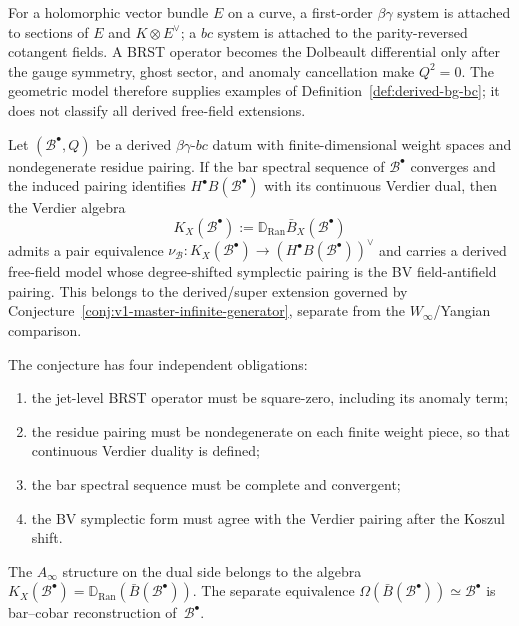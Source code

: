 \begin{remark}
For a holomorphic vector bundle $E$ on a curve, a first-order
$\beta\gamma$ system is attached to sections of $E$ and
$K\otimes E^\vee$; a $bc$ system is attached to the parity-reversed
cotangent fields. A BRST operator becomes the Dolbeault differential
only after the gauge symmetry, ghost sector, and anomaly cancellation
make $Q^2=0$. The geometric model therefore supplies examples of
Definition~\ref{def:derived-bg-bc}; it does not classify all derived
free-field extensions.
\end{remark}

\begin{conjecture}\label{conj:extended-ferm-ghost}
Let $(\mathcal B^\bullet,Q)$ be a derived $\beta\gamma$-$bc$ datum
with finite-dimensional weight spaces and nondegenerate residue
pairing. If the bar spectral sequence of $\mathcal B^\bullet$
converges and the induced pairing identifies
$H^\bullet B(\mathcal B^\bullet)$ with its continuous Verdier dual,
then the Verdier algebra
\[
K_X(\mathcal B^\bullet):=
\mathbb D_{\mathrm{Ran}}\bar B_X(\mathcal B^\bullet)
\]
admits a pair equivalence
$\nu_{\mathcal B}\colon K_X(\mathcal B^\bullet)\to
(H^\bullet B(\mathcal B^\bullet))^\vee$ and carries a derived
free-field model whose degree-shifted symplectic
pairing is the BV field-antifield pairing. This belongs to the
derived/super extension governed by
Conjecture~\ref{conj:v1-master-infinite-generator}, separate from the
$W_\infty$/Yangian comparison.
\end{conjecture}

\begin{remark}
The conjecture has four independent obligations:
\begin{enumerate}[label=\textup{(\roman*)}]
\item the jet-level BRST operator must be square-zero, including its
anomaly term;
\item the residue pairing must be nondegenerate on each finite weight
piece, so that continuous Verdier duality is defined;
\item the bar spectral sequence must be complete and convergent;
\item the BV symplectic form must agree with the Verdier pairing after
the Koszul shift.
\end{enumerate}
The $A_\infty$ structure on the dual side belongs to the algebra
$K_X(\mathcal B^\bullet)=
\mathbb D_{\mathrm{Ran}}(\bar B(\mathcal B^\bullet))$. The separate
equivalence
$\Omega(\bar B(\mathcal B^\bullet))\simeq\mathcal B^\bullet$
is bar--cobar reconstruction of~$\mathcal B^\bullet$.
\end{remark}

